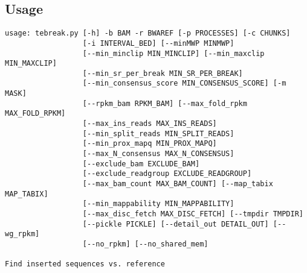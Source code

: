 \documentclass[letterpaper,11pt]{article}
\begin{document}
\subsection{Usage}
\begin{verbatim}
usage: tebreak.py [-h] -b BAM -r BWAREF [-p PROCESSES] [-c CHUNKS]
                  [-i INTERVAL_BED] [--minMWP MINMWP]
                  [--min_minclip MIN_MINCLIP] [--min_maxclip MIN_MAXCLIP]
                  [--min_sr_per_break MIN_SR_PER_BREAK]
                  [--min_consensus_score MIN_CONSENSUS_SCORE] [-m MASK]
                  [--rpkm_bam RPKM_BAM] [--max_fold_rpkm MAX_FOLD_RPKM]
                  [--max_ins_reads MAX_INS_READS]
                  [--min_split_reads MIN_SPLIT_READS]
                  [--min_prox_mapq MIN_PROX_MAPQ]
                  [--max_N_consensus MAX_N_CONSENSUS]
                  [--exclude_bam EXCLUDE_BAM]
                  [--exclude_readgroup EXCLUDE_READGROUP]
                  [--max_bam_count MAX_BAM_COUNT] [--map_tabix MAP_TABIX]
                  [--min_mappability MIN_MAPPABILITY]
                  [--max_disc_fetch MAX_DISC_FETCH] [--tmpdir TMPDIR]
                  [--pickle PICKLE] [--detail_out DETAIL_OUT] [--wg_rpkm]
                  [--no_rpkm] [--no_shared_mem]

Find inserted sequences vs. reference


\end{verbatim}
\end{document}
